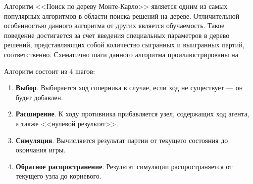 Алгоритм <<Поиск по дереву Монте-Карло>> является одним из самых популярных алгоритмов в области поиска решений на дереве. Отличительной особенностью данного алгоритма от других является обучаемость. Такое поведение достигается за счет введения специальных параметров в дерево решений, представляющих собой количество сыгранных и выигранных партий, соответственно. Схематично шаги данного алгоритма проиллюстрированы на 


Алгоритм состоит из 4 шагов:
\begin{enumerate}
    \item \textbf{Выбор}. Выбирается ход соперника в случае, если ход не существует --- он будет добавлен.
    \item \textbf{Расширение}. К ходу противника прибавляется узел, содержащих ход агента, а также <<нулевой результат>>.
    \item \textbf{Симуляция}. Вычисляется результат партии от текущего состояния до окончания игры.
    \item \textbf{Обратное распространение}. Результат симуляции распространяется от текущего узла до корневого.
\end{enumerate}
